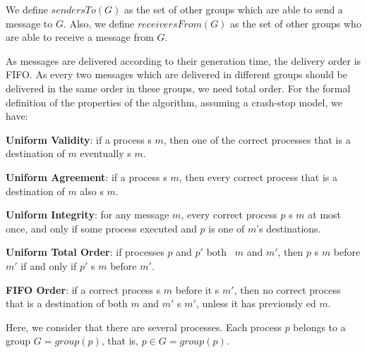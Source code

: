 \documentclass[times, 10pt]{article}
\begin{document}
We define $sendersTo(G)$ as the set of other groups which are able to send a message to $G$. Also, we define $receiversFrom(G)$ as the set of other groups who are able to receive a message from $G$.

As messages are delivered according to their generation time, the delivery order is FIFO. As every two messages which are delivered in different groups should be delivered in the same order in these groups, we need total order. For the formal definition of the properties of the algorithm, assuming a crash-stop model, we have:

\textbf{Uniform Validity}: if a process \cms{}s $m$, then one of the correct processes that is a destination of $m$ eventually \cons{}s $m$.

\textbf{Uniform Agreement}: if a process \cons{}s $m$, then every correct process that is a destination of $m$ also \cons{}s $m$.

\textbf{Uniform Integrity}: for any message $m$, every correct process $p$ \cons{}s $m$ at most once, and only if some process executed  and $p$ is one of $m$'s destinations.

\textbf{Uniform Total Order}: if processes $p$ and $p'$ both \cons\ $m$ and $m'$, then $p$ \cons{}s $m$ before $m'$ if and only if $p'$ \cons{}s $m$ before $m'$.

\textbf{FIFO Order}: if a correct process \cms{}s $m$ before it \cms{}s $m'$, then no correct process that is a destination of both $m$ and $m'$ \cons{}s $m'$, unless it has previously \cons{}ed  $m$.

Here, we consider that there are several processes. Each process $p$ belongs to a group $G = group(p)$, that is, $p \in G = group(p)$. 


\end{document}
